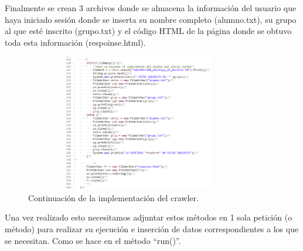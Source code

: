 	\noindent Finalmente se crean 3 archivos donde se almacena la información del usuario que haya iniciado sesión donde se inserta su nombre completo (alumno.txt), su grupo al que esté inscrito (grupo.txt) y el código HTML de la página donde se obtuvo toda esta información (respoinse.html).
	\pagebreak
	
	\begin{figure}[hbt!]
		\centering
		\includegraphics[width=10cm, height=6cm]{Imagenes/Crawler/Codigo5}
		\caption{Continuación de la implementación del crawler.}
		\label{codigo5}
	\end{figure}
	
	\noindent Una vez realizado esto necesitamos adjuntar estos métodos en 1 sola petición (o método) para realizar su ejecución e inserción de datos correspondientes a los que se necesitan.
	Como se hace en el método “run()”. \\
	
